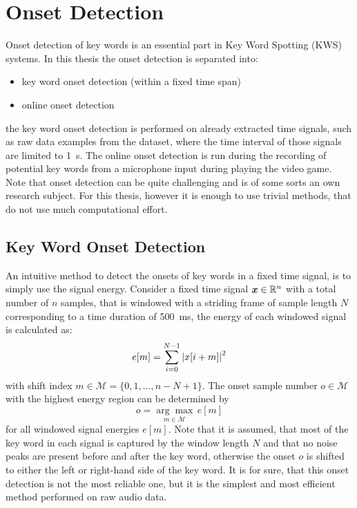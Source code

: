 
\section{Onset Detection}\label{sec:signal_onset}
\thesisStateReady
\thesisStateNew
Onset detection of key words is an essential part in Key Word Spotting (KWS) systems.
In this thesis the onset detection is separated into:
\begin{itemize}
  \item key word onset detection (within a fixed time span)
  \item online onset detection
\end{itemize}
the key word onset detection is performed on already extracted time signals, such as raw data examples from the dataset, where the time interval of those signals are limited to \SI{1}{\second}.
The online onset detection is run during the recording of potential key words from a microphone input during playing the video game.
Note that onset detection can be quite challenging and is of some sorts an own research subject.
For this thesis, however it is enough to use trivial methods, that do not use much computational effort.



\subsection{Key Word Onset Detection}
An intuitive method to detect the onsets of key words in a fixed time signal, is to simply use the signal energy.
Consider a fixed time signal $\bm{x} \in \mathbb{R}^n$ with a total number of $n$ samples, that is windowed with a striding frame of sample length $N$ corresponding to a time duration of \SI{500}{\milli\second}, the energy of each windowed signal is calculated as:
\begin{equation}\label{eq:e_win}
  e[m] = \sum_{i=0}^{N-1} \abs{x[i + m]}^2
\end{equation}
with shift index $m \in \mathcal{M} = \{0, 1, \dots, n - N + 1\}$.
The onset sample number $o \in \mathcal{M}$ with the highest energy region can be determined by
\begin{equation}\label{eq:onset}
  o = \underset{m \in \mathcal{M}}{\arg \max} \, e[m]
\end{equation}
for all windowed signal energies $e[m]$.
Note that it is assumed, that most of the key word in each signal is captured by the window length $N$ and that no noise peaks are present before and after the key word, otherwise the onset $o$ is shifted to either the left or right-hand side of the key word.
It is for sure, that this onset detection is not the most reliable one, but it is the simplest and most efficient method performed on raw audio data.

